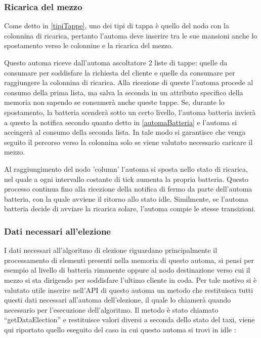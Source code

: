\subsubsection{Ricarica del mezzo} \label{tappe colonnina}
Come detto in \ref{tipiTappe}, uno dei tipi di tappa è quello del nodo con la colonnina di ricarica, pertanto l'automa deve inserire tra le sue mansioni anche lo spostamento verso le colonnine e la ricarica del mezzo.

Questo automa riceve dall'automa ascoltatore 2 liste di tappe: quelle da consumare per soddisfare la richiesta del cliente e quelle da consumare per raggiungere la colonnina di ricarica. Alla ricezione di queste l'automa procede al consumo della prima lista, ma salva la seconda in un attributo specifico della memoria non sapendo se consumerà anche queste tappe. Se, durante lo spostamento, la batteria scenderà sotto un certo livello, l'automa batteria invierà a questo la notifica secondo quanto detto in \ref{automaBatteria} e l'automa si accingerà al consumo della seconda lista. 
In tale modo si garantisce che venga seguito il percorso verso la colonnina solo se viene valutato necessario caricare il mezzo.

Al raggiungimento del nodo 'column' l'automa si sposta nello stato di ricarica, nel quale a ogni intervallo costante di tick aumenta la propria batteria. Questo processo continua fino alla ricezione della notifica di fermo da parte dell'automa batteria, con la quale avviene il ritorno allo stato idle.
Similmente, se l'automa batteria decide di avviare la ricarica solare, l'automa compie le stesse transizioni.

\subsubsection{Dati necessari all'elezione}
I dati necessari all'algoritmo di elezione riguardano principalmente il processamento di elementi presenti nella memoria di questo automa, si pensi per esempio al livello di batteria rimanente oppure al nodo destinazione verso cui il mezzo si sta dirigendo per soddisfare l'ultimo cliente in coda.
Per tale motivo si è valutato utile inserire nell'API di questo automa un metodo che restituisca tutti questi dati necessari all'automa dell'elezione, il quale lo chiamerà quando necessario per l'esecuzione dell'algoritmo. Il metodo è stato chiamato ``getDataElection'' e restituisce valori diversi a seconda dello stato del taxi, viene qui riportato quello eseguito del caso in cui questo automa si trovi in idle :

